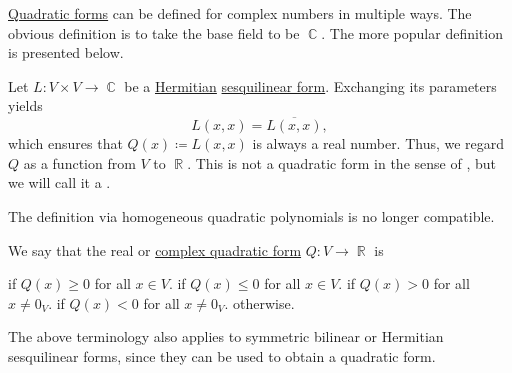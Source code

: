 \begin{remark}\label{rem:complex_quadratic_form}
  \hyperref[thm:quadratic_forms]{Quadratic forms} can be defined for complex numbers in multiple ways. The obvious definition is to take the base field to be \( \BbbC \). The more popular definition is presented below.

  Let \( L: V \times V \to \BbbC \) be a \hyperref[def:hermitian_form]{Hermitian} \hyperref[def:sesquilinear_form]{sesquilinear form}. Exchanging its parameters yields
  \begin{equation*}
    L(x, x) = \overline {L(x, x)},
  \end{equation*}
  which ensures that \( Q(x) \coloneqq L(x, x) \) is always a real number. Thus, we regard \( Q \) as a function from \( V \) to \( \BbbR \). This is not a quadratic form in the sense of , but we will call it a .

  The definition via homogeneous quadratic polynomials is no longer compatible.
\end{remark}

\begin{definition}\label{thm:quadratic_forms_definiteness}\mimprovised
  We say that the real or \hyperref[rem:complex_quadratic_form]{complex quadratic form} \( Q: V \to \BbbR \) is
  \begin{thmenum}
      if \( Q(x) \geq 0 \) for all \( x \in V \).
      if \( Q(x) \leq 0 \) for all \( x \in V \).
      if \( Q(x) > 0 \) for all \( x \neq 0_V \).
      if \( Q(x) < 0 \) for all \( x \neq 0_V \).
      otherwise.
  \end{thmenum}

  The above terminology also applies to symmetric bilinear or Hermitian sesquilinear forms, since they can be used to obtain a quadratic form.
\end{definition}

